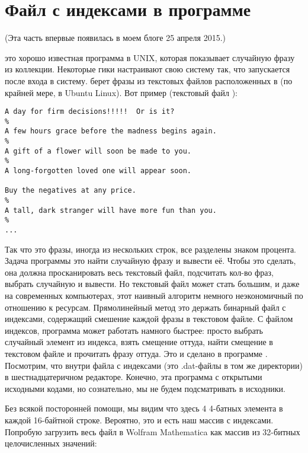\section{Файл с индексами в программе }

(Эта часть впервые появилась в моем блоге 25 апреля 2015.)

 это хорошо известная программа в UNIX, которая показывает случайную фразу из коллекции.
Некоторые гики настраивают свою систему так, что  запускается после входа в систему.
 берет фразы из текстовых файлов расположенных в  (по крайней мере, в Ubuntu Linux).
Вот пример (текстовый файл ):

\begin{lstlisting}
A day for firm decisions!!!!!  Or is it?
%
A few hours grace before the madness begins again.
%
A gift of a flower will soon be made to you.
%
A long-forgotten loved one will appear soon.

Buy the negatives at any price.
%
A tall, dark stranger will have more fun than you.
%
...
\end{lstlisting}

Так что это фразы, иногда из нескольких строк, все разделены знаком процента.
Задача программы  это найти случайную фразу и вывести её.
Чтобы это сделать, она должна просканировать весь текстовый файл, подсчитать кол-во фраз, выбрать случайную и вывести.
Но текстовый файл может стать большим, и даже на современных компьютерах, этот наивный алгоритм немного неэкономичный
по отношению к ресурсам.
Прямолинейный метод это держать бинарный файл с индексами, содержащий смешение каждой фразы в текстовом файле.
С файлом индексов, программа  может работать намного быстрее: просто выбрать случайный элемент из индекса,
взять смещение оттуда, найти смещение в текстовом файле и прочитать фразу оттуда.
Это и сделано в программе .
Посмотрим, что внутри файла с индексами (это .dat-файлы в том же директории) в шестнадцатеричном редакторе.
Конечно, эта программа с открытыми исходными кодами, но сознательно, мы не будем подсматривать в исходники.



Без всякой посторонней помощи, мы видим что здесь 4 4-батных элемента в каждой 16-байтной строке.
Вероятно, это и есть наш массив с индексами.
Попробую загрузить весь файл в Wolfram Mathematica как массив из 32-битных целочисленных значений:

